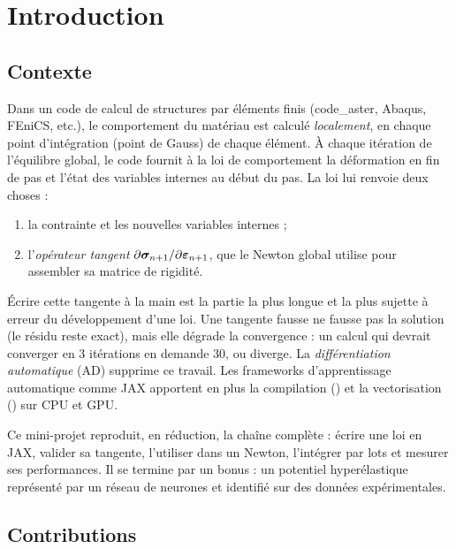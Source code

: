 \section{Introduction}

\subsection{Contexte}

Dans un code de calcul de structures par éléments finis (code\_aster, Abaqus, FEniCS, etc.), le comportement du matériau est calculé \emph{localement}, en chaque point d'intégration (point de Gauss) de chaque élément. À chaque itération de l'équilibre global, le code fournit à la loi de comportement la déformation en fin de pas et l'état des variables internes au début du pas. La loi lui renvoie deux choses :
\begin{enumerate}[nosep]
  \item la contrainte et les nouvelles variables internes ;
  \item l'\emph{opérateur tangent} $\partial\boldsymbol{\sigma}_{n+1}/\partial\boldsymbol{\varepsilon}_{n+1}$, que le Newton global utilise pour assembler sa matrice de rigidité.
\end{enumerate}

Écrire cette tangente à la main est la partie la plus longue et la plus sujette à erreur du développement d'une loi. Une tangente fausse ne fausse pas la solution (le résidu reste exact), mais elle dégrade la convergence : un calcul qui devrait converger en 3 itérations en demande 30, ou diverge. La \emph{différentiation automatique} (AD) supprime ce travail. Les frameworks d'apprentissage automatique comme JAX apportent en plus la compilation () et la vectorisation () sur CPU et GPU.

Ce mini-projet reproduit, en réduction, la chaîne complète : écrire une loi en JAX, valider sa tangente, l'utiliser dans un Newton, l'intégrer par lots et mesurer ses performances. Il se termine par un bonus : un potentiel hyperélastique représenté par un réseau de neurones et identifié sur des données expérimentales.

\subsection{Contributions}

